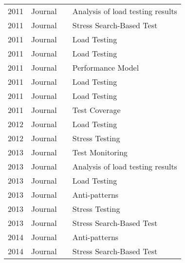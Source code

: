 \begin{table}[]
\begin{tabular}{llll}
2011          & Journal          & \cite{Babbar2011}               & Analysis of load testing results \\
2011          & Journal          & \cite{Baars2011}                & Stress Search-Based Test         \\
2011          & Journal          & \cite{Barna2011}                & Load Testing                     \\
2011          & Journal          & \cite{Nguyen2011}               & Load Testing                     \\
2011          & Journal          & \cite{Shoaib2011}               & Performance Model                \\
2011          & Journal          & \cite{Santos2011}               & Load Testing                     \\
2011          & Journal          & \cite{Zhang2011}                & Load Testing                     \\
2011          & Journal          & \cite{Catelani2011}             & Test Coverage                    \\
2012          & Journal          & \cite{Yan2012}                  & Load Testing                     \\
2012          & Journal          & \cite{Grechanik2012}            & Stress Testing                   \\
2013          & Journal          & \cite{Vasar2012}                & Test Monitoring                  \\
2013          & Journal          & \cite{Malik2013a}               & Analysis of load testing results \\
2013          & Journal          & \cite{Wang2013}                 & Load Testing                     \\
2013          & Journal          & \cite{Wert2013a}                & Anti-patterns                    \\
2013          & Journal          & \cite{Barna2013}                & Stress Testing                   \\
2013          & Journal          & \cite{DiAlesio2013}             & Stress Search-Based Test         \\
2014          & Journal          & \cite{Wert2014}                 & Anti-patterns                    \\
2014          & Journal          & \cite{DiAlesio2014}             & Stress Search-Based Test         \\

\end{tabular}
\end{table}
